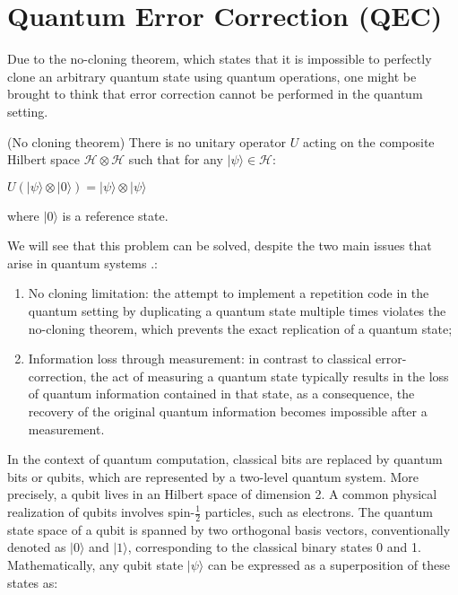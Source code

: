 \documentclass{Configuration_Files/PoliMi3i_thesis}
\begin{document}









\newpage
\section{Quantum Error Correction (QEC)}
\label{sec:QEC}

Due to the no-cloning theorem, which states that  it is impossible to perfectly clone an arbitrary quantum state using quantum operations, one might be brought to think that error correction cannot be performed in the quantum setting.

\begin{theorem}(No cloning theorem)
	There is no unitary operator $U$ acting on the composite Hilbert space $\mathscr{H} \otimes \mathscr{H}$ such that for any $|\psi\rangle \in \mathscr{H}$:
	
	\begin{center}
		$U(|\psi\rangle\otimes|0\rangle) = |\psi\rangle \otimes |\psi\rangle$
	\end{center}
	
	where $|0\rangle$ is a reference state.
\end{theorem}

We will see that this problem can be solved, despite the two main issues that arise in quantum systems \cite{Cha06}.: 

\begin{enumerate}
	\item No cloning limitation: the attempt to implement a repetition code in the quantum setting by duplicating a quantum state multiple times violates the no-cloning theorem, which prevents the exact replication of a quantum state;
	
	\item Information loss through measurement: in contrast to classical error-correction, the act of measuring a quantum state typically results in the loss of quantum information contained in that state, as a consequence, the recovery of the original quantum information becomes impossible after a measurement.
\end{enumerate}

In the context of quantum computation, classical bits are replaced by quantum bits or qubits, which are represented by a two-level quantum system. More precisely, a qubit lives in an Hilbert space of dimension 2. A common physical realization of qubits involves spin-$\frac{1}{2}$ particles, such as electrons. The quantum state space of a qubit is spanned by two orthogonal basis vectors, conventionally denoted as $ |0 \rangle$ and $ |1 \rangle$, corresponding to the classical binary states 0 and 1. Mathematically, any qubit state 
$ |\psi \rangle$ can be expressed as a superposition of these states as:
\end{document}
